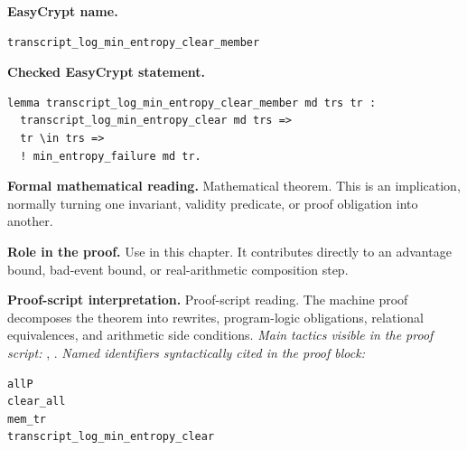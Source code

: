 \begin{formaltheorem}
\noindent\textbf{EasyCrypt name.}
\begin{lstlisting}[language=EasyCrypt,basicstyle=\ttfamily\scriptsize]
transcript_log_min_entropy_clear_member
\end{lstlisting}
\noindent\textbf{Checked EasyCrypt statement.}
\begin{lstlisting}[language=EasyCrypt,basicstyle=\ttfamily\scriptsize]
lemma transcript_log_min_entropy_clear_member md trs tr :
  transcript_log_min_entropy_clear md trs =>
  tr \in trs =>
  ! min_entropy_failure md tr.
\end{lstlisting}
\noindent\textbf{Formal mathematical reading.}
Mathematical theorem. This is an implication, normally turning one invariant, validity predicate, or proof obligation into another.

\noindent\textbf{Role in the proof.}
Use in this chapter. It contributes directly to an advantage bound, bad-event bound, or real-arithmetic composition step.

\noindent\textbf{Proof-script interpretation.}
Proof-script reading. The machine proof decomposes the theorem into rewrites, program-logic obligations, relational equivalences, and arithmetic side conditions.
\emph{Main tactics visible in the proof script:} , .
\emph{Named identifiers syntactically cited in the proof block:}
\begin{lstlisting}[language=EasyCrypt,basicstyle=\ttfamily\scriptsize]
allP
clear_all
mem_tr
transcript_log_min_entropy_clear
\end{lstlisting}

\end{formaltheorem}

